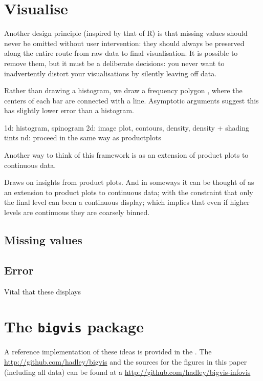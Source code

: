 \documentclass[journal]{vgtc}                %
\begin{document}
\section{Visualise}
\label{sec:visualise}

Another design principle (inspired by that of R) is that missing values should never be omitted without user intervention: they should always be preserved along the entire route from raw data to final visualisation. It is possible to remove them, but it must be a deliberate decisions: you never want to inadvertently distort your visualisations by silently leaving off data.

Rather than drawing a histogram, we draw a frequency polygon \citep{scott:1985a}, where the centers of each bar are connected with a line.  Asymptotic arguments suggest this has slightly lower error than a histogram.

1d: histogram, spinogram
2d: image plot, contours, density, density + shading tints
nd: proceed in the same way as productplots

Another way to think of this framework is as an extension of product plots \citep{me:prodplots} to continuous data.  

Draws on insights from product plots. And in someways it can be thought of as an extension to product plots to continuous data; with the constraint that only the final level can been a continuous display; which implies that even if higher levels are continuous they are coarsely binned.

\subsection{Missing values}

\subsection{Error}

Vital that these displays

\section{The {\tt bigvis} package}
\label{sec:bigvis}

A reference implementation of these ideas is provided in the .  The \url{http://github.com/hadley/bigvis} and the sources for the figures in this paper (including all data) can be found at a \url{http://github.com/hadley/bigvis-infovis}
\end{document}
